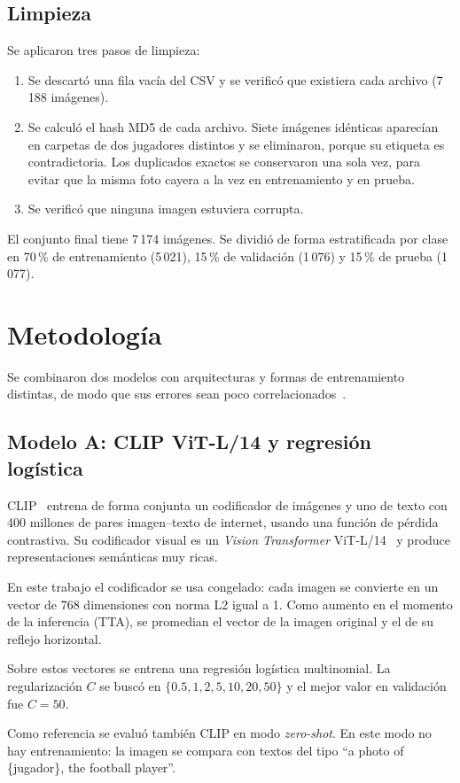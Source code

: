 \documentclass[journal]{IEEEtran}
\begin{document}
\subsection{Limpieza}
Se aplicaron tres pasos de limpieza:
\begin{enumerate}
\item Se descartó una fila vacía del CSV y se verificó que existiera cada archivo (7\,188 imágenes).
\item Se calculó el hash MD5 de cada archivo. Siete imágenes idénticas aparecían en carpetas de dos jugadores distintos y se eliminaron, porque su etiqueta es contradictoria. Los duplicados exactos se conservaron una sola vez, para evitar que la misma foto cayera a la vez en entrenamiento y en prueba.
\item Se verificó que ninguna imagen estuviera corrupta.
\end{enumerate}
El conjunto final tiene 7\,174 imágenes. Se dividió de forma estratificada por clase en 70\,\% de entrenamiento (5\,021), 15\,\% de validación (1\,076) y 15\,\% de prueba (1\,077).

\section{Metodología}
Se combinaron dos modelos con arquitecturas y formas de entrenamiento distintas, de modo que sus errores sean poco correlacionados~\cite{dietterich}.

\subsection{Modelo A: CLIP ViT-L/14 y regresión logística}
CLIP~\cite{clip} entrena de forma conjunta un codificador de imágenes y uno de texto con 400 millones de pares imagen--texto de internet, usando una función de pérdida contrastiva. Su codificador visual es un \textit{Vision Transformer} ViT-L/14~\cite{vit} y produce representaciones semánticas muy ricas.

En este trabajo el codificador se usa congelado: cada imagen se convierte en un vector de 768 dimensiones con norma L2 igual a 1. Como aumento en el momento de la inferencia (TTA), se promedian el vector de la imagen original y el de su reflejo horizontal.

Sobre estos vectores se entrena una regresión logística multinomial. La regularización $C$ se buscó en $\{0.5,1,2,5,10,20,50\}$ y el mejor valor en validación fue $C=50$.

Como referencia se evaluó también CLIP en modo \textit{zero-shot}. En este modo no hay entrenamiento: la imagen se compara con textos del tipo ``a photo of \{jugador\}, the football player''.
\end{document}
